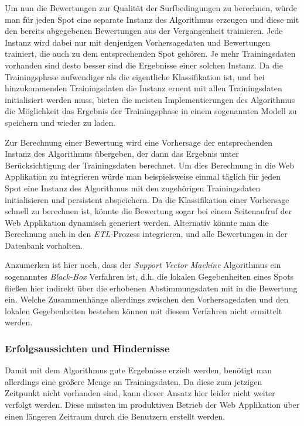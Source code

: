Um nun die Bewertungen zur Qualität der Surfbedingungen zu berechnen,
würde man für jeden Spot eine separate Instanz des Algorithmus
erzeugen und diese mit den bereits abgegebenen Bewertungen aus der
Vergangenheit trainieren. Jede Instanz wird dabei nur mit denjenigen
Vorhersagedaten und Bewertungen trainiert, die auch zu dem
entsprechenden Spot gehören. Je mehr Trainingsdaten vorhanden sind
desto besser sind die Ergebnisse einer solchen Instanz. Da die
Trainingsphase aufwendiger als die eigentliche Klassifikation ist, und
bei hinzukommenden Trainingsdaten die Instanz erneut mit allen
Trainingsdaten initialisiert werden muss, bieten die meisten
Implementierungen des Algorithmus die Möglichkeit das Ergebnis der
Trainingsphase in einem sogenannten Modell zu speichern und wieder zu
laden.

Zur Berechnung einer Bewertung wird eine Vorhersage der entsprechenden
Instanz des Algorithmus übergeben, der dann das Ergebnis unter
Berücksichtigung der Trainingsdaten berechnet. Um dies Berechnung in
die Web Applikation zu integrieren würde man beispielsweise einmal
täglich für jeden Spot eine Instanz des Algorithmus mit den
zugehörigen Trainingsdaten initialisieren und persistent
abspeichern. Da die Klassifikation einer Vorhersage schnell zu
berechnen ist, könnte die Bewertung sogar bei einem Seitenaufruf der
Web Applikation dynamisch generiert werden. Alternativ könnte man die
Berechnung auch in den \textit{ETL-}Prozess integrieren, und alle
Bewertungen in der Datenbank vorhalten.

Anzumerken ist hier noch, dass der \textit{Support Vector Machine}
Algorithmus ein sogenanntes \textit{Black-Box} Verfahren ist, d.h. die
lokalen Gegebenheiten eines Spots fließen hier indirekt über die
erhobenen Abstimmungsdaten mit in die Bewertung ein. Welche
Zusammenhänge allerdings zwischen den Vorhersagedaten und den lokalen
Gegebenheiten bestehen können mit diesem Verfahren nicht ermittelt
werden.

\subsubsection{Erfolgsaussichten und Hindernisse}
Damit mit dem Algorithmus gute Ergebnisse erzielt werden, benötigt man
allerdings eine größere Menge an Trainingsdaten. Da diese zum jetzigen
Zeitpunkt nicht vorhanden sind, kann dieser Ansatz hier leider nicht
weiter verfolgt werden. Diese müssten im produktiven Betrieb der Web
Applikation über einen längeren Zeitraum durch die Benutzern erstellt
werden.

